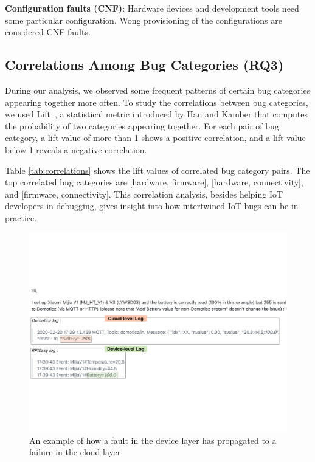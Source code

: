 \textbf{Configuration faults (CNF)}: Hardware devices and development tools need some particular configuration. Wong provisioning of the configurations are considered CNF faults.


\subsection{Correlations Among Bug Categories (RQ3)}
During our analysis, we observed some frequent patterns of certain bug categories appearing together more often. To study the correlations between bug categories, we used Lift~\cite{kamber2001data}, a statistical metric introduced by Han and Kamber that computes the probability of two categories appearing together. For each pair of bug category, a lift value of more than 1 shows a positive correlation, and a lift value below 1 reveals a negative correlation. 

Table \ref{tab:correlations} shows the lift values of correlated bug category pairs. The top correlated bug categories are [hardware, firmware], [hardware, connectivity], and [firmware, connectivity]. This correlation analysis, besides helping IoT developers in debugging, gives insight into how intertwined IoT bugs can be in practice.


 \begin{figure}%
  \centering
   \includegraphics[width=\linewidth]{imgs/corEx}
  \caption{An example of how a fault in the device layer has propagated to a failure in the cloud layer}
  \label{fig:corEx}
\end{figure}


